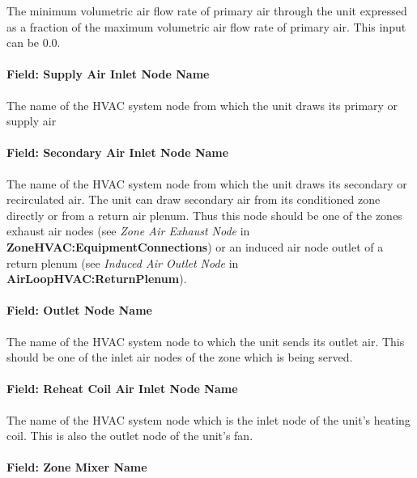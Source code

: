 The minimum volumetric air flow rate of primary air through the unit expressed as a fraction of the maximum volumetric air flow rate of primary air. This input can be 0.0.

\paragraph{Field: Supply Air Inlet Node Name}\label{field-supply-air-inlet-node-name}

The name of the HVAC system node from which the unit draws its primary or supply air

\paragraph{Field: Secondary Air Inlet Node Name}\label{field-secondary-air-inlet-node-name}

The name of the HVAC system node from which the unit draws its secondary or recirculated air. The unit can draw secondary air from its conditioned zone directly or from a return air plenum. Thus this node should be one of the zones exhaust air nodes (see \emph{Zone Air Exhaust Node} in \textbf{ZoneHVAC:EquipmentConnections}) or an induced air node outlet of a return plenum (see \emph{Induced Air Outlet Node} in \textbf{AirLoopHVAC:ReturnPlenum}).

\paragraph{Field: Outlet Node Name}\label{field-outlet-node-name}

The name of the HVAC system node to which the unit sends its outlet air. This should be one of the inlet air nodes of the zone which is being served.

\paragraph{Field: Reheat Coil Air Inlet Node Name}\label{field-reheat-coil-air-inlet-node-name}

The name of the HVAC system node which is the inlet node of the unit's heating coil. This is also the outlet node of the unit's fan.

\paragraph{Field: Zone Mixer Name}\label{field-zone-mixer-name}


